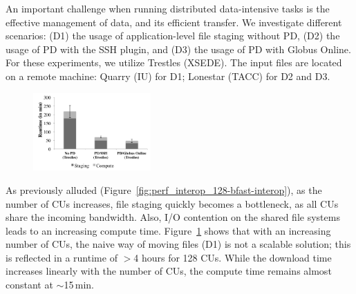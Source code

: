 \documentclass[conference]{IEEEtran}
\begin{document}
An important challenge
when running distributed data-intensive tasks is the effective
management of data, and its efficient transfer. We investigate
different scenarios: (D1) the usage of application-level file staging
without PD, (D2) the usage of PD with the SSH plugin, %
and (D3) the usage of PD with Globus
Online. For these experiments, we utilize Trestles (XSEDE). The input
files are located on a remote machine: Quarry (IU) for D1; Lonestar
(TACC) for D2 and D3.


\begin{figure}[t]
	\upp
	\centering
		\includegraphics[width=0.4\textwidth]{../perf/sc/pd-128cus.pdf}
	\caption{}
	\label{fig:perf_sc_download-concurrent-cus}
\end{figure}


As previously alluded
(Figure~\ref{fig:perf_interop_128-bfast-interop}), as the number of
CUs increases, file staging quickly becomes a bottleneck, as all CUs
share the incoming bandwidth.  Also, I/O contention on the shared file
systems leads to an increasing compute time.
Figure~\ref{fig:perf_sc_download-concurrent-cus} shows that with an
increasing number of CUs, the naive way of moving files (D1) is not a
scalable solution; this is reflected in a runtime of $>$4 hours for 128
CUs.  While the download time increases linearly with the number of
CUs, the compute time remains almost constant at $\sim$15\,min.
\end{document}
